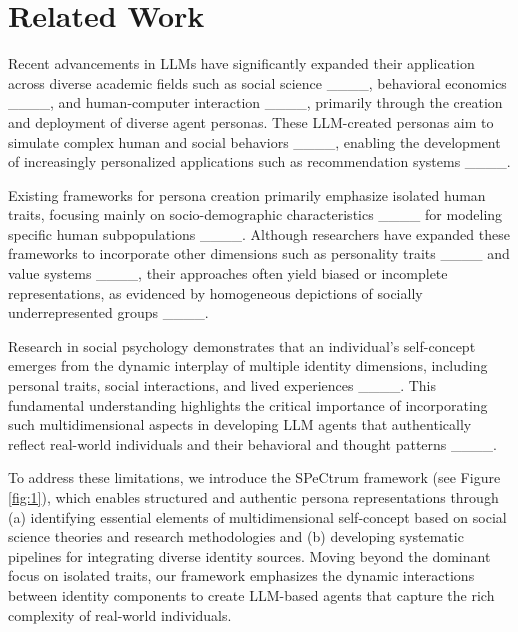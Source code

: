 \section{Related Work}
Recent advancements in LLMs have significantly expanded their application across diverse academic fields such as social science ____, behavioral economics ____, and human-computer interaction ____, primarily through the creation and deployment of diverse agent personas. These LLM-created personas aim to simulate complex human and social behaviors ____, enabling the development of increasingly personalized applications such as recommendation systems ____.

Existing frameworks for persona creation primarily emphasize isolated human traits, focusing mainly on socio-demographic characteristics ____ for modeling specific human subpopulations ____. Although researchers have expanded these frameworks to incorporate other dimensions such as personality traits ____ and value systems ____, their approaches often yield biased or incomplete representations, as evidenced by homogeneous depictions of socially underrepresented groups ____.

Research in social psychology demonstrates that an individual's self-concept emerges from the dynamic interplay of multiple identity dimensions, including personal traits, social interactions, and lived experiences ____. This fundamental understanding highlights the critical importance of incorporating such multidimensional aspects in developing LLM agents that authentically reflect real-world individuals and their behavioral and thought patterns ____.

To address these limitations, we introduce the SPeCtrum framework (see Figure \ref{fig:1}), which enables structured and authentic persona representations through (a) identifying essential elements of multidimensional self-concept based on social science theories and research methodologies and (b) developing systematic pipelines for integrating diverse identity sources. Moving beyond the dominant focus on isolated traits, our framework emphasizes the dynamic interactions between identity components to create LLM-based agents that capture the rich complexity of real-world individuals.